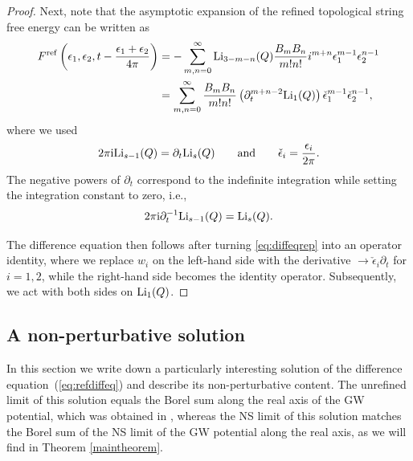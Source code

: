 \documentclass[pdftex]{sigma}
\numberwithin{equation}{section}
\begin{document}
\begin{proof}
Next, note that the asymptotic expansion of the refined topological string free energy can be written as
\begin{align*}
F^{{\rm ref}}\left(\epsilon_1,\epsilon_2,t-\frac{\epsilon_1+\epsilon_2}{4\pi}\right) &= -\sum_{m,n=0}^{\infty} {\rm Li}_{3-m-n}(Q) \frac{B_m B_n}{m! n!} i^{m+n} \epsilon_1^{m-1} \epsilon_2^{n-1} \\
&= \sum_{m,n=0}^{\infty} \frac{B_m B_n}{m! n!} \left(\partial_t^{m+n-2} {\rm Li}_{1}(Q)\right) \check{\epsilon}_1^{m-1} \check{\epsilon}_2^{n-1},
\end{align*}
where we used
\begin{equation*}
 2 \pi \mathrm{i} {\rm Li}_{s-1} (Q) = \partial_t {\rm Li}_s(Q) \qquad \mathrm{and} \qquad \check{\epsilon}_i =\frac{\epsilon_i}{2\pi}.
\end{equation*}
The negative powers of $\partial_t$ correspond to the indefinite integration while setting the integration constant to zero, i.e.,
\begin{equation*} 2 \pi \mathrm{i} \partial_t^{-1} {\rm Li}_{s-1}(Q) ={\rm Li}_{s}(Q).\end{equation*}

The difference equation then follows after turning \eqref{eq:diffeqrep} into an operator identity, where we replace $w_i$ on the left-hand side with the derivative $\rightarrow \check{\epsilon}_i \partial_t$ for $i=1,2$, while the right-hand side becomes the identity operator. Subsequently, we act with both sides on ${\rm Li}_1(Q)$.
\end{proof}

\subsection{A non-perturbative solution} \label{sec:nonpertsol}

In this section we write down a particularly interesting solution of the difference equation~(\ref{eq:refdiffeq}) and describe its non-perturbative content. The unrefined limit of this solution equals the Borel sum along the real axis of the GW potential, which was obtained in \cite{ASTT21}, whereas the NS limit of this solution matches the Borel sum of the NS limit of the GW potential along the real axis, as we will find in Theorem \ref{maintheorem}.
\end{document}
